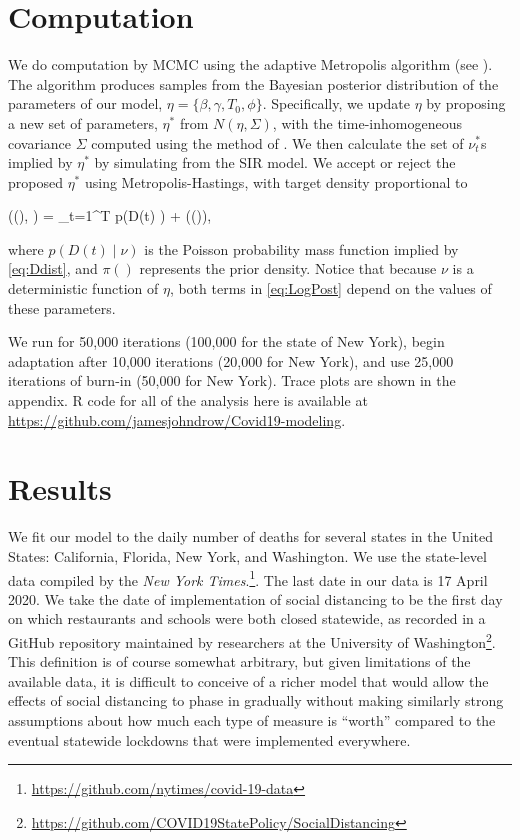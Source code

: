 \documentclass[11pt]{article}
\theoremstyle{plain}
\newcommand{\be}{\begin{equs}}
\newcommand{\ee}{\end{equs}}
\newcommand{\1}{\mathbf 1}
\begin{document}
\section{Computation}\label{sec:computation}
We do computation by MCMC using the adaptive Metropolis algorithm (see \cite{haario2001adaptive}). The algorithm produces samples from the Bayesian posterior distribution of the parameters of our model, $\eta =\{ \beta, \gamma, T_0, \phi \}$. Specifically, we update $\eta$  by proposing a new set of parameters, $\eta^*$ from $N(\eta,\Sigma)$, with the time-inhomogeneous covariance $\Sigma$ computed using the method of \cite{haario2001adaptive}. We then calculate the  set of $\nu^*_t$s implied by $\eta^*$ by simulating from the SIR model.  We accept or reject the proposed $\eta^*$ using Metropolis-Hastings, with target density proportional to
\be \label{eq:LogPost}
\ell(\nu(\eta), \eta) = \sum_{t=1}^T p(D(t) \mid \nu) + \log(\pi(\eta)),
\ee
where $p(D(t) \mid \nu)$ is the Poisson probability mass function implied by \eqref{eq:Ddist}, and $\pi()$ represents the prior density. Notice that because $\nu$ is a deterministic function of $\eta$, both terms in \eqref{eq:LogPost} depend on the values of these parameters. 


We run for 50,000 iterations (100,000 for the state of New York), begin adaptation after 10,000 iterations (20,000 for New York), and use 25,000 iterations of burn-in (50,000 for New York). Trace plots are shown in the appendix. R code for all of the analysis here is available at \url{https://github.com/jamesjohndrow/Covid19-modeling}.

\section{Results}
We fit our model to the daily number of deaths for several states in the United States: California, Florida, New York, and Washington. We use the state-level data compiled by the \textit{New York Times}.\footnote{\url{https://github.com/nytimes/covid-19-data}}. The last date in our data is 17 April 2020. We take the date of implementation of social distancing to be the first day on which restaurants and schools were both closed statewide, as recorded in a GitHub repository maintained by researchers at the University of Washington\footnote{\url{https://github.com/COVID19StatePolicy/SocialDistancing}}. This definition is of course somewhat arbitrary, but given limitations of the available data, it is difficult to conceive of a richer model that would allow the effects of social distancing to phase in gradually without making similarly strong assumptions about how much each type of measure is ``worth'' compared to the eventual statewide lockdowns that were implemented everywhere.
\end{document}
